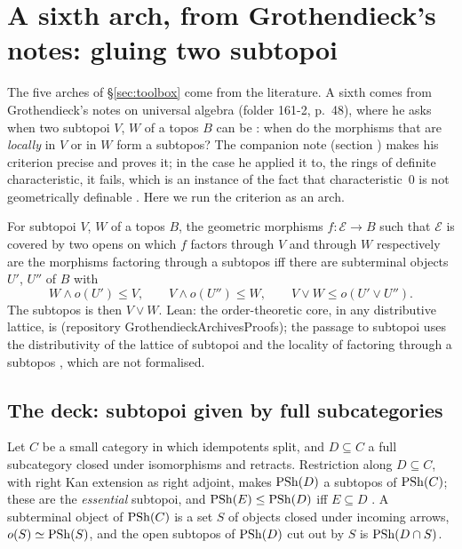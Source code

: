 \section{A sixth arch, from Grothendieck's notes: gluing two subtopoi}\label{sec:gluing}

The five arches of \S\ref{sec:toolbox} come from the literature. A sixth comes from Grothendieck's notes on universal algebra (folder 161-2, p.~48), where he asks when two subtopoi $V$, $W$ of a topos $B$ can be : when do the morphisms that are \emph{locally} in $V$ or in $W$ form a subtopos? The companion note \cite{bridges-notes} (section ) makes his criterion precise and proves it; in the case he applied it to, the rings of definite characteristic, it fails, which is an instance of the fact that characteristic~$0$ is not geometrically definable \cite[\S8.2]{caramello-flat}. Here we run the criterion as an arch.

\begin{bridge}[Gluing]\label{br:glue}
For subtopoi $V$, $W$ of a topos $B$, the geometric morphisms $f\colon\mathcal E\to B$ such that $\mathcal E$ is covered by two opens on which $f$ factors through $V$ and through $W$ respectively are the morphisms factoring through a subtopos iff there are subterminal objects $U'$, $U''$ of $B$ with
\[
W\wedge o(U')\le V,\qquad V\wedge o(U'')\le W,\qquad V\vee W\le o(U'\vee U'').
\]
The subtopos is then $V\vee W$. Lean: the order-theoretic core, in any distributive lattice, is  (repository GrothendieckArchivesProofs); the passage to subtopoi uses the distributivity of the lattice of subtopoi and the locality of factoring through a subtopos \cite[\S A4.5]{elephant}, which are not formalised.
\end{bridge}

\subsection{The deck: subtopoi given by full subcategories}

Let $C$ be a small category in which idempotents split, and $D\subseteq C$ a full subcategory closed under isomorphisms and retracts. Restriction along $D\subseteq C$, with right Kan extension as right adjoint, makes $\mathrm{PSh}(D)$ a subtopos of $\mathrm{PSh}(C)$; these are the \emph{essential} subtopoi, and $\mathrm{PSh}(E)\le\mathrm{PSh}(D)$ iff $E\subseteq D$ \cite{kelly-lawvere}. A subterminal object of $\mathrm{PSh}(C)$ is a set $S$ of objects closed under incoming arrows, $o(S)\simeq\mathrm{PSh}(S)$, and the open subtopos of $\mathrm{PSh}(D)$ cut out by $S$ is $\mathrm{PSh}(D\cap S)$.

